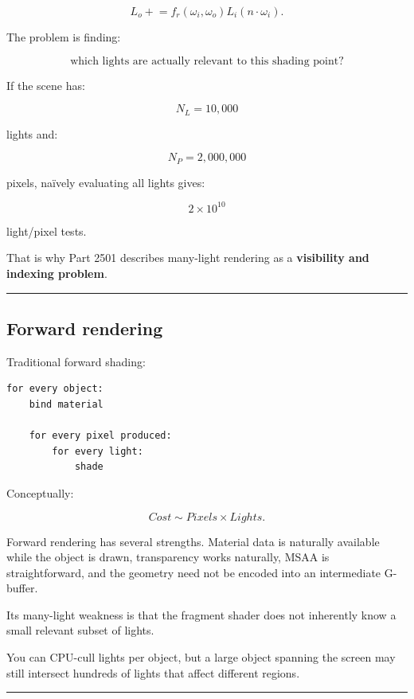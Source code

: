\[
L_o \mathrel{+}=
f_r(\omega_i,\omega_o)
L_i
(n\cdot\omega_i).
\]

The problem is finding:

\[
\boxed{
\text{which lights are actually relevant to this shading point?}
}
\]

If the scene has:

\[
N_L=10,000
\]

lights and:

\[
N_P=2,000,000
\]

pixels, naïvely evaluating all lights gives:

\[
2\times10^{10}
\]

light/pixel tests.

That is why Part 2501 describes many-light rendering as a \textbf{visibility and indexing problem}.

\begin{center}\rule{0.5\linewidth}{0.5pt}\end{center}

\subsection{Forward rendering}\label{04-visual-computing-ii-ch040-forward-rendering}

Traditional forward shading:

\begin{verbatim}
for every object:
    bind material

    for every pixel produced:
        for every light:
            shade
\end{verbatim}

Conceptually:

\[
Cost
\sim
Pixels\times Lights.
\]

Forward rendering has several strengths. Material data is naturally available while the object is drawn, transparency works naturally, MSAA is straightforward, and the geometry need not be encoded into an intermediate G-buffer.

Its many-light weakness is that the fragment shader does not inherently know a small relevant subset of lights.

You can CPU-cull lights per object, but a large object spanning the screen may still intersect hundreds of lights that affect different regions.

\begin{center}\rule{0.5\linewidth}{0.5pt}\end{center}

